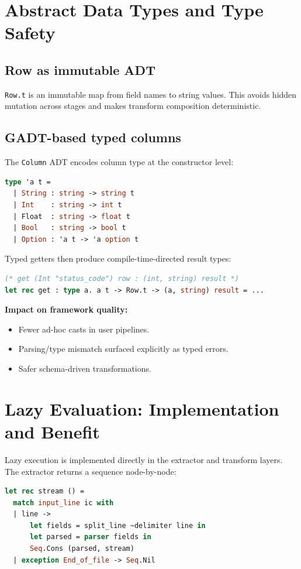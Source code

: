 \documentclass[11pt,a4paper]{article}
\begin{document}
\section{Abstract Data Types and Type Safety}
\subsection*{Row as immutable ADT}
\texttt{Row.t} is an immutable map from field names to string values. This avoids hidden mutation across stages and makes transform composition deterministic.

\subsection*{GADT-based typed columns}
The \texttt{Column} ADT encodes column type at the constructor level:
\begin{lstlisting}[style=compact, language=Caml]
type 'a t =
  | String : string -> string t
  | Int    : string -> int t
  | Float  : string -> float t
  | Bool   : string -> bool t
  | Option : 'a t -> 'a option t
\end{lstlisting}

Typed getters then produce compile-time-directed result types:
\begin{lstlisting}[style=compact, language=Caml]
(* get (Int "status_code") row : (int, string) result *)
let rec get : type a. a t -> Row.t -> (a, string) result = ...
\end{lstlisting}

\textbf{Impact on framework quality:}
\begin{itemize}
  \item Fewer ad-hoc casts in user pipelines.
  \item Parsing/type mismatch surfaced explicitly as typed errors.
  \item Safer schema-driven transformations.
\end{itemize}

\section{Lazy Evaluation: Implementation and Benefit}
Lazy execution is implemented directly in the extractor and transform layers. The extractor returns a sequence node-by-node:
\begin{lstlisting}[style=compact, language=Caml]
let rec stream () =
  match input_line ic with
  | line ->
      let fields = split_line ~delimiter line in
      let parsed = parser fields in
      Seq.Cons (parsed, stream)
  | exception End_of_file -> Seq.Nil
\end{lstlisting}
\end{document}
